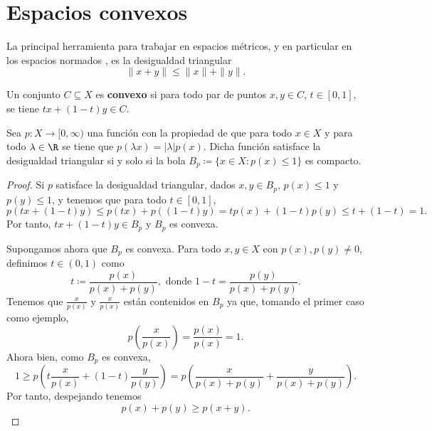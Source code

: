 \section{Espacios convexos}

La principal herramienta para trabajar en espacios métricos, y en particular en los espacios normados \cite{babb}, es la desigualdad triangular 
\begin{equation}
    \| x + y \| \leq \| x \| + \| y \|.
\end{equation}

\begin{definition}
    Un conjunto $ C \subseteq X $ es {\bf convexo} si para todo par de puntos $ x, y \in C $, $ t \in [0, 1] $, se tiene $ tx + (1-t)y \in C $.
\end{definition}

\begin{proposition}
    Sea $ p \colon X \to [0,\infty) $ una función con la propiedad de que para todo $ x \in X $ y para todo $ \lambda \in \R $ se tiene que $ p(\lambda x) = |\lambda| p(x) $. Dicha función satisface la desigualdad triangular si y solo si la bola  $B_p \coloneq \{ x \in X \colon p(x) \leq 1 \} $ es compacto.
\end{proposition}
\begin{proof}
    Si $ p $ satisface la desigualdad triangular, dados $ x, y \in B_p $, $ p(x) \leq 1 $ y  $ p(y) \leq 1 $, y tenemos que para todo $ t \in [0, 1] $,
    \begin{equation}
        p(tx + (1-t) y) \leq p(tx) + p((1-t)y) = tp(x) + (1-t)p(y) \leq t + (1-t) = 1.
    \end{equation}
    Por tanto, $ tx + (1-t)y \in B_p $ y $ B_p $ es convexa.

    Supongamos ahora que $ B_p $ es convexa. Para todo $ x, y \in X $ con $ p(x), p(y) \neq 0 $, definimos $ t \in (0, 1) $ como
    \begin{equation}
        t \coloneq \frac{p(x)}{p(x) + p(y)}, \text{ donde } 1 - t = \frac{p(y)}{p(x) + p(y)}.
    \end{equation}
    Tenemos que $ \frac{x}{p(x) } $ y $ \frac{x}{p(x) } $ están contenidos en $ B_p $ ya que, tomando el primer caso como ejemplo, 
    \begin{equation}
        p(\frac{x}{p(x)}) = \frac{p(x)}{p(x)} = 1.
    \end{equation}
    Ahora bien, como $ B_p $ es convexa, 
    \begin{equation}
        1 \geq p\left(t \frac{x}{p(x)} + (1-t) \frac{y}{p(y)}\right) = p\left( \frac{x}{p(x)+p(y)} + \frac{y}{p(x)+p(y)} \right).
    \end{equation}
    Por tanto, despejando tenemos
    \begin{equation}
        p(x)+p(y) \geq p(x+y).
    \end{equation}
\end{proof}

